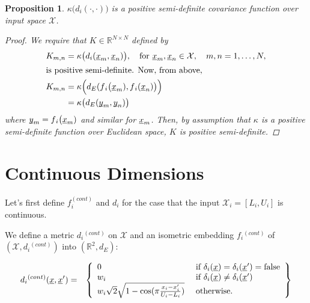 \documentclass[letterpaper]{article}
\newcommand{\vect}[1]{\underline{\smash{#1}}}
\renewcommand{\v}[1]{\vect{#1}}
\newcommand{\reals}{\mathds{R}}
\newcommand{\sX}{\mathcal{X}}
\newtheorem{prop}[thm]{Proposition}
\begin{document}
\begin{prop}
  $\kappa\bigl(d{_i}(\cdot,\cdot)\bigr)$ is a positive semi-definite covariance function over input space $\sX$. 
\label{prop:cont_psd_proof}
\begin{proof}
We require that $K \in \reals^{N\times N}$ defined by
\begin{align*}
 K_{m, n} & = \kappa\bigl(d{_i}(\v{x}_m,\v{x}_n)\bigr)
,\quad \text{for }
\v{x}_m, \v{x}_n \in \sX,\quad m, n = 1, \ldots, N, 
\\
\intertext{is positive semi-definite. Now, from above,}
K_{m, n} & = \kappa\Bigl(d_E(f{_i}\bigl(\v{x}_m), f{_i}(\v{x}_n)\bigr)\Bigr) \\
& = \kappa\bigl(d_E(\v{y}_m, \v{y}_n)\bigr)
\end{align*}
where $\v{y}_m = f{_i}\bigl(\v{x}_m)$ and similar for $\v{x}_m$. Then, by assumption that $\kappa$ is a positive semi-definite function over Euclidean space, $K$ is positive semi-definite. 
\end{proof}
\end{prop}


\section{Continuous Dimensions}

Let's first define $f^{(cont)}_i$ and $d_i$ for the case that the input $\sX_i=[L_i, U_i]$ is continuous. 

We define a metric $d{_i}^{(cont)}$ on $\sX$ and an isometric embedding $f{_i}^{(cont)}$ of $(\sX, d{_i}^{(cont)})$ into $(\reals^{2},d_E)$:



\begin{eqnarray}
\nonumber{}d{_i}^{(cont)}(\v{x}, \v{x}') & = & \left\{\begin{array}{ll}
\nonumber{} 0 & \textrm{ if } \delta_i(\v{x}) = \delta_i(\v{x}') = \textrm{false}\\
\nonumber{} w_i & \textrm{ if } \delta_i(\v{x}) \neq \delta_i(\v{x}')\\
\nonumber{} w_i \sqrt{2} \sqrt{1 - \cos(\pi \frac{x_i-x_i'}{U_i-L_i})} & \textrm{ otherwise. }\end{array}\right\}
\end{eqnarray}
\end{document}
